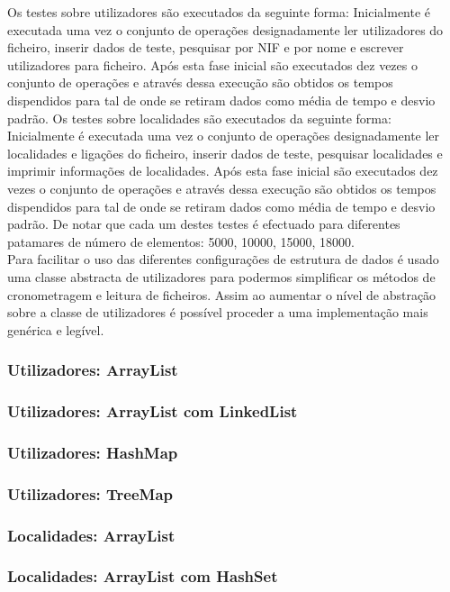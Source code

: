 \documentclass[a5paper,twocolumn, 11pt]{article}
\begin{document}
Os testes sobre utilizadores são executados da seguinte forma:
Inicialmente é executada uma vez o conjunto de operações designadamente ler utilizadores do ficheiro, inserir dados de teste, pesquisar por NIF e por nome e escrever utilizadores para ficheiro. Após esta fase inicial são executados dez vezes o conjunto de operações e através dessa execução são obtidos os tempos dispendidos para tal de onde se retiram dados como média de tempo e desvio padrão.
Os testes sobre localidades são executados da seguinte forma:
Inicialmente é executada uma vez o conjunto de operações designadamente ler localidades e ligações do ficheiro, inserir dados de teste, pesquisar localidades e imprimir informações de localidades. Após esta fase inicial são executados dez vezes o conjunto de operações e através dessa execução são obtidos os tempos dispendidos para tal de onde se retiram dados como média de tempo e desvio padrão.
De notar que cada um destes testes é efectuado para diferentes patamares de número de elementos: 5000, 10000, 15000, 18000.\\

Para facilitar o uso das diferentes configurações de estrutura de dados é usado uma classe abstracta de utilizadores para podermos simplificar os métodos de cronometragem e leitura de ficheiros. Assim ao  aumentar o nível de abstração sobre a classe de utilizadores é possível proceder a uma implementação mais genérica e legível.
\subsubsection{Utilizadores: ArrayList}
\subsubsection{Utilizadores: ArrayList com LinkedList}
\subsubsection{Utilizadores: HashMap}
\subsubsection{Utilizadores: TreeMap}
\subsubsection{Localidades: ArrayList}
\subsubsection{Localidades: ArrayList com HashSet}
\end{document}
